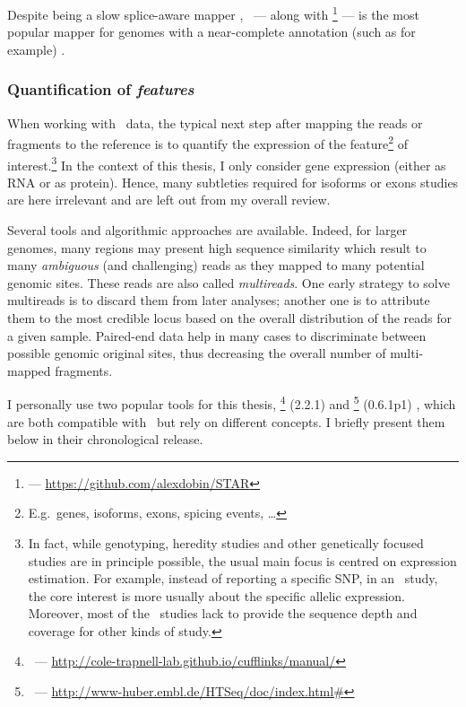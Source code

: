 Despite being a slow splice-aware mapper ,
\toph\ --- along with
\footnote{ --- \href{https://github.com/alexdobin/STAR}%
{https://github.com/alexdobin/STAR}}  --- is the most
popular mapper for genomes with a near-complete annotation (such as
 for example) .


\subsubsection{Quantification of \emph{features}}

When working with \Rnaseq\ data, the typical next step after mapping the reads or
fragments to the reference is to quantify the expression of the
feature\footnote{E.g.\ genes, isoforms, exons, spicing events, \ldots}
of interest.\footnote{In fact, while genotyping, heredity
studies and other genetically focused studies are in principle possible, the usual
main focus is centred on expression estimation. For example, instead of
reporting a specific \gls{SNP}, in an \Rnaseq\ study, the core interest is more
usually about the specific allelic expression. Moreover, most of the \Rnaseq\
studies lack to provide the sequence depth and coverage for other kinds of study.}
In the context of this thesis, I only consider gene expression (either as \gls{RNA}
or as protein). Hence, many subtleties required for isoforms or exons studies are
here irrelevant and are left out from my overall review.

Several tools and algorithmic approaches are available.
Indeed, for larger genomes, many regions may present high sequence similarity
which result to many \emph{ambiguous} (and challenging) reads as they mapped to
many potential genomic sites. These reads are also called \emph{multireads}.
One early strategy to solve multireads is to discard them from later analyses;
another one is to attribute them to the most credible locus based on
the overall distribution of the reads for a given sample. 
Paired-end data help in many cases to discriminate between possible genomic
original sites, thus decreasing the overall number of multi-mapped fragments.

I personally use two popular tools for this thesis,
\cuffl\footnote{\cuffl\ ---
\href{http://cole-trapnell-lab.github.io/cufflinks/manual/}%
{http://cole-trapnell-lab.github.io/cufflinks/manual/}} (2.2.1)
 and
\htseq\footnote{\htseq\ ---
\href{http://www-huber.embl.de/HTSeq/doc/index.html\#}%
{http://www-huber.embl.de/HTSeq/doc/index.html\#}} (0.6.1p1)
,
which are both compatible with \toph\ but rely on different concepts.
I briefly present them below in their chronological release.

